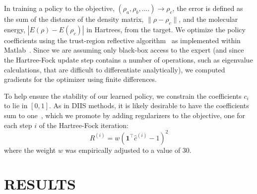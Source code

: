 \documentclass[twoside,11pt]{article}
\begin{document}

In training a policy to the objective, $(\rho_a, \rho_b, ....) \rightarrow \rho_c $, the error is defined as the sum of the distance of the density matrix, $\|\rho-\rho_c\|$, and the molecular energy, $|E(\rho)-E(\rho_c)|$ in Hartrees, from the target. We optimize the policy coefficients using the trust-region reflective algorithm~\citep{Coleman1996} as implemented within Matlab~\citep{Matlab}.  Since we are assuming only black-box access to the expert (and since the Hartree-Fock update step contains a number of operations, such as eigenvalue calculations, that are difficult to differentiate analytically), we computed gradients for the optimizer using finite differences.

To help ensure the stability of our learned policy, we constrain the coefficients $c_i$ to lie in $[0, 1]$. As in DIIS methods, it is likely desirable to have the coefficients sum to one~\citep{EDIIS}, which we promote by adding regularizers to the objective, one for each step $i$ of the Hartree-Fock iteration:
\begin{equation}
R^{(i)} =  w  (\mathbf 1^\top \hat{c}^{(i)} - 1)^2
\end{equation}
where the weight $w$ was empirically adjusted to a value of 30.

\section{RESULTS}
\end{document}
